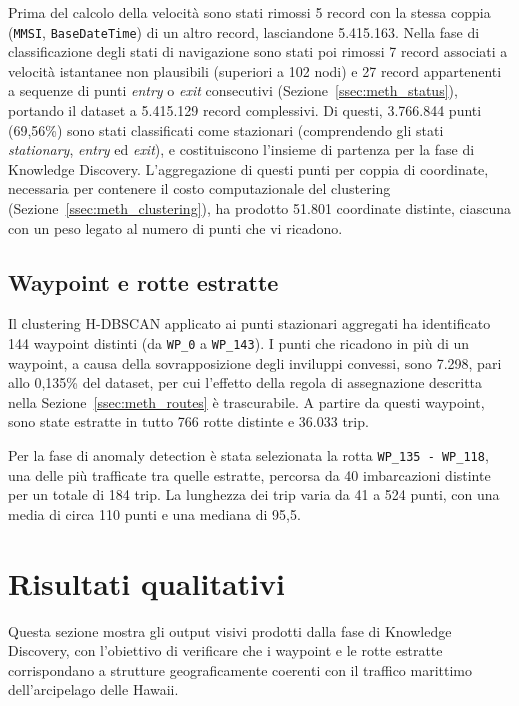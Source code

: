 Prima del calcolo della velocità sono stati rimossi 5 record con la stessa coppia
(\texttt{MMSI}, \texttt{BaseDateTime}) di un altro record, lasciandone 5.415.163. Nella fase di
classificazione degli stati di navigazione sono stati poi rimossi 7 record associati a
velocità istantanee non plausibili (superiori a 102 nodi) e 27 record appartenenti a
sequenze di punti \emph{entry} o \emph{exit} consecutivi
(Sezione~\ref{ssec:meth_status}), portando il dataset a 5.415.129 record complessivi.
Di questi, 3.766.844 punti (69,56\%) sono
stati classificati come stazionari (comprendendo gli stati \emph{stationary},
\emph{entry} ed \emph{exit}), e costituiscono l'insieme di partenza per la fase di
Knowledge Discovery. L'aggregazione di questi punti per coppia di coordinate, necessaria
per contenere il costo computazionale del clustering (Sezione~\ref{ssec:meth_clustering}),
ha prodotto 51.801 coordinate distinte, ciascuna con un peso legato al numero di punti che
vi ricadono.
 
\subsection{Waypoint e rotte estratte}
 
Il clustering H-DBSCAN applicato ai punti stazionari aggregati ha identificato
144 waypoint distinti (da \texttt{WP\_0} a \texttt{WP\_143}).
I punti che ricadono in più di un waypoint, a causa della sovrapposizione degli inviluppi
convessi, sono 7.298, pari allo 0,135\% del dataset, per cui l'effetto della regola di assegnazione
descritta nella Sezione~\ref{ssec:meth_routes} è trascurabile. A partire da questi waypoint,
sono state estratte in tutto 766 rotte distinte e 36.033 trip.
 
Per la fase di anomaly detection è stata selezionata la rotta \texttt{WP\_135 - WP\_118},
una delle più trafficate tra quelle estratte, percorsa da 40 imbarcazioni distinte
per un totale di 184 trip. La lunghezza dei trip varia da 41 a 524 punti, con
una media di circa 110 punti e una mediana di 95,5.
 
\section{Risultati qualitativi}\label{sec:res_qualitative}
 
Questa sezione mostra gli output visivi prodotti dalla fase di Knowledge Discovery,
con l'obiettivo di verificare che i waypoint e le rotte estratte corrispondano a
strutture geograficamente coerenti con il traffico marittimo dell'arcipelago delle
Hawaii.

